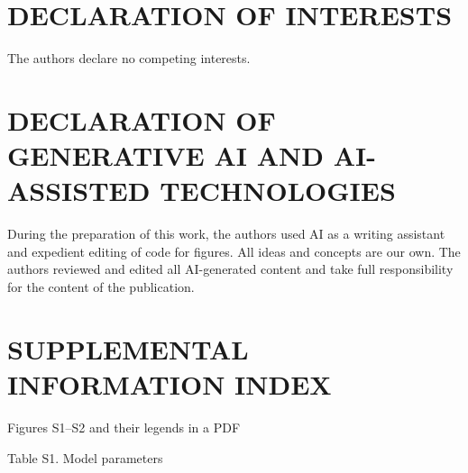 \documentclass[12pt,letterpaper]{article}
\begin{document}
\section*{DECLARATION OF INTERESTS}

The authors declare no competing interests.

\section*{DECLARATION OF GENERATIVE AI AND AI-ASSISTED TECHNOLOGIES}

During the preparation of this work, the authors used AI as a writing assistant and expedient editing of code for figures.
All ideas and concepts are our own.
The authors reviewed and edited all AI-generated content and take full responsibility for the content of the publication.

\section*{SUPPLEMENTAL INFORMATION INDEX}

\begin{description}
  \item Figures S1--S2 and their legends in a PDF
  \item Table S1. Model parameters
\end{description}

\newpage



\newpage



\newpage


\end{document}
